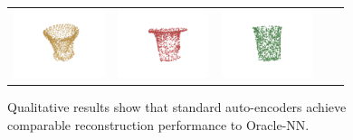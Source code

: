 \documentclass[bachelor, nocolorlinks, printoneside]{seuthesis} %
\begin{document}
\begin{Main}
\begin{figure}[!h]
\begin{tabular}{c@{}c@{}c@{}c@{}c@{}}
    	\includegraphics[width=0.22\columnwidth,height=2cm]{figs/real_dataset/AE_label/jar_d56098d4d83f5976a2c59a4d90e63212_fine.png} &
    	\includegraphics[width=0.22\columnwidth,height=2cm]{figs/real_dataset/AE/jar_d56098d4d83f5976a2c59a4d90e63212_fine.png} &
    	\includegraphics[width=0.22\columnwidth,height=2cm]{figs/real_dataset/oracle/jar_d56098d4d83f5976a2c59a4d90e63212_oracle.png}
    	\\
    \end{tabular}
    \caption{\small Qualitative results show that standard auto-encoders achieve comparable reconstruction performance to Oracle-NN. }
    \label{fig:visualize_KC}
\end{figure}

\FloatBarrier

\end{Main}
\end{document}
